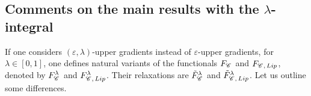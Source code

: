 \documentclass[12pt]{amsart}
\newcommand{\sfd}{{\sf d}}
\newcommand{\X}{{\rm X}}
\newcommand{\lip}{{\rm lip}}
\newcommand{\Lip}{{\rm Lip}}
\newcommand{\mm}{\mathfrak m}
\newcommand{\F}{{\rm F}}
\newtheorem{theorem}{Theorem}[section]
\theoremstyle{definition}
\newcommand{\Chain}[1]{\mathscr{C}^{#1}}
\newcommand{\UG}[1]{{\rm UG}^{#1}}
\newcommand{\LUG}[1]{{\rm LUG}^{#1}}
\renewcommand{\F}[1]{{\rm F}_{{\rm #1}}}
\newcommand{\relF}[1]{\tilde{\rm F}_{{\rm #1}}}
\begin{document}

%
\subsection{Comments on the main results with the $\lambda$-integral}
\label{sec:comments_for_every_lambda}
        If one considers $(\varepsilon, \lambda)$-upper gradients instead of $\varepsilon$-upper gradients, for $\lambda \in [0,1]$, one defines natural variants of the functionals $\F{\Chain{}}$ and $\F{\Chain{},\,\Lip}$, denoted by $\F{\Chain{}}^\lambda$ and $\F{\Chain{},\,\Lip}^\lambda$. Their relaxations are $\relF{\Chain{}}^\lambda$ and $\relF{\Chain{},\,\Lip}^\lambda$. Let us outline some differences.
        
\end{document}
